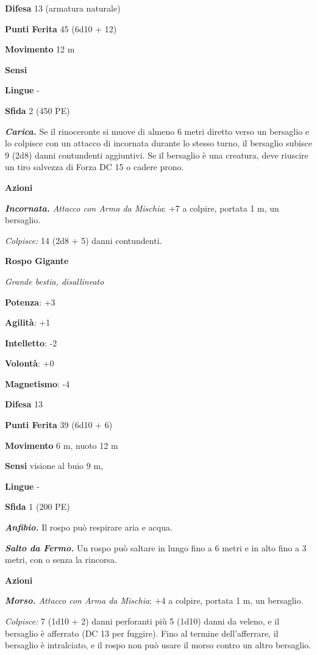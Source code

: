 \begin{multicols}{2}
\textbf{Difesa} 13 (armatura naturale)

\textbf{Punti Ferita} 45 (6d10 + 12)

\textbf{Movimento} 12 m

\textbf{Sensi} 

\textbf{Lingue} -

\textbf{Sfida} 2 (450 PE)\smallskip

\emph{\textbf{Carica.}} Se il rinoceronte si muove di almeno 6 metri
diretto verso un bersaglio e lo colpisce con un attacco di incornata
durante lo stesso turno, il bersaglio subisce 9 (2d8) danni contundenti
aggiuntivi. Se il bersaglio è una creatura, deve riuscire un tiro
salvezza di Forza DC 15 o cadere prono.

\smallskip\textbf{Azioni}

\emph{\textbf{Incornata.} Attacco con Arma da Mischia}: +7 a colpire,
portata 1 m, un bersaglio.

\emph{Colpisce:} 14 (2d8 + 5) danni contundenti.

\textbf{Rospo Gigante}

\emph{Grande bestia, disallineato}

\textbf{Potenza}: +3

\textbf{Agilità}: +1

\textbf{Intelletto}: -2

\textbf{Volontà}: +0

\textbf{Magnetismo}: -4

\textbf{Difesa} 13

\textbf{Punti Ferita} 39 (6d10 + 6)

\textbf{Movimento} 6 m, nuoto 12 m

\textbf{Sensi} visione al buio 9 m, 

\textbf{Lingue} -

\textbf{Sfida} 1 (200 PE)\smallskip

\emph{\textbf{Anfibio.}} Il rospo può respirare aria e acqua.

\emph{\textbf{Salto da Fermo.}} Un rospo può saltare in lungo fino a 6
metri e in alto fino a 3 metri, con o senza la rincorsa.

\smallskip\textbf{Azioni}

\emph{\textbf{Morso.} Attacco con Arma da Mischia}: +4 a colpire,
portata 1 m, un bersaglio.

\emph{Colpisce:} 7 (1d10 + 2) danni perforanti più 5 (1d10) danni da
veleno, e il bersaglio è afferrato (DC 13 per fuggire). Fino al termine
dell'afferrare, il bersaglio è intralciato, e il rospo non può usare il
morso contro un altro bersaglio.


\end{multicols}
